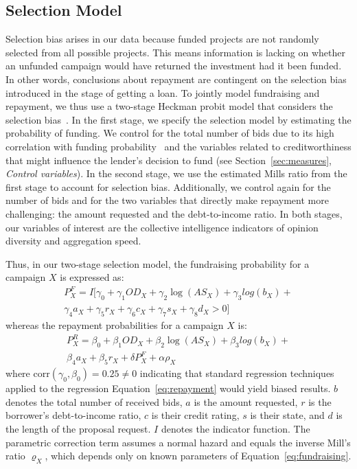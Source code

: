 \documentclass[sigconf]{acmart}
\begin{document}
\subsection{Selection Model}
Selection bias arises in our data because funded projects are not randomly selected from all possible projects. This means information is lacking on whether an unfunded campaign would have returned the investment had it been funded. In other words, conclusions about repayment are contingent on the selection bias introduced in the stage of getting a loan. To jointly model fundraising and repayment, we thus use a two-stage Heckman probit model that considers the selection bias~\cite{Heckman1976,uzzi1999embeddedness}. In the first stage, we specify the selection model by estimating the probability of funding. We control for the total number of bids due to its high correlation with funding probability~\cite{Ceyhan2011,dambanemuya2019harnessing} and the variables related to creditworthiness that might influence the lender’s decision to fund (see Section~\ref{sec:measures}, \emph{Control variables}). In the second stage, we use the estimated Mills ratio from the first stage to account for selection bias. Additionally, we control again for the number of bids and for the two variables that directly make repayment more challenging: the amount requested and the debt-to-income ratio. In both stages, our variables of interest are the collective intelligence indicators of opinion diversity and aggregation speed.

Thus, in our two-stage selection model, the fundraising probability for a campaign $X$ is expressed as:
\begin{equation}
    \label{eq:fundraising}
    \begin{aligned}
    P^F_X=I[\gamma_0+\gamma_1 OD_X+\gamma_2 \log(AS_X)+\gamma_3 log(b_X)+ \\
    \gamma_4 a_X+ \gamma_5 r_X+\gamma_6 c_X+\gamma_7 s_X+\gamma_8 d_X>0]
    \end{aligned}
\end{equation}
whereas the repayment probabilities for a campaign $X$ is:
\begin{equation}
    \label{eq:repayment}
    \begin{aligned}
    P^R_X=\beta_0+\beta_1 OD_X+\beta_2 \log(AS_X)+\beta_3 log(b_X)+ \\
    \beta_4 a_X+ \beta_5 r_X+ \delta P^F_X+\alpha\rho_X
    \end{aligned}
\end{equation}
where $\text{corr}(\gamma_0,\beta_0)=0.25\neq0$ indicating that standard regression techniques applied to the regression Equation~\ref{eq:repayment} would yield biased results. $b$ denotes the total number of received bids, $a$ is the amount requested, $r$ is the borrower's debt-to-income ratio, $c$ is their credit rating, $s$ is their state, and $d$ is the length of the proposal request. $I$ denotes the indicator function. The parametric correction term assumes a normal hazard and equals the inverse Mill’s ratio $\varrho_X$, which depends only on known parameters of Equation~\ref{eq:fundraising}.
\end{document}
